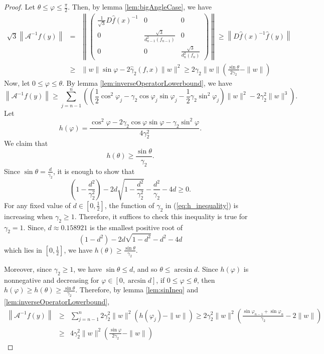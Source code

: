 \documentclass[12pt,oneside,reqno]{amsart}
\theoremstyle{definition}
\begin{document}
		\begin{proof}
			Let $\theta\leq \varphi\leq \frac{\pi}{2}$. Then, by lemma \ref{lem:bigAngleCase}, we have
			{\footnotesize
				\begin{eqnarray*}
					\sqrt{3}\left\|\mathcal{A}^{-1}f(y)\right\| & = &  \left\|\left(\begin{array}{ccc}
						\frac{1}{\sqrt{3}}D\hat{f}(x)^{-1} & 0 & 0\\
						0 & \frac{\sqrt{3}}{d_{n-1}^2(f_{n-1})} & 0 \\
						0 & 0 & \frac{\sqrt{3}}{d_{n}^2(f_{n})}
					\end{array}\right)\right\|\geq \left\|D\hat{f}(x)^{-1}\hat{f}(y)\right\|\\
					&\geq & \|w\|\sin\varphi -2\hat{\gamma}_2(f,x)\|w\|^2 \geq 2\gamma_2\|w\|\left(\frac{\sin\theta}{2\gamma_2}-\|w\|\right)
				\end{eqnarray*}}
				Now, let $0\leq \varphi \leq \theta$. By lemma \ref{lem:inverseOperatorLowerbound}, we have
				{\footnotesize
					\[\left\|\mathcal{A}^{-1}f(y)\right\|\geq \sum\limits_{j=n-1}^n\left(\left(\frac{1}{2}\cos^2\varphi_{j}-\gamma_{2}\cos\varphi_j\sin\varphi_j-\frac{1}{2}\gamma_{2}\sin^2\varphi_j\right)\|w\|^2 -2\gamma_{2}^2\|w\|^3\right).\]}
				Let 
				{\footnotesize
					\[h(\varphi) = \frac{\cos^2 \varphi - 2\gamma_2 \cos\varphi \sin\varphi - \gamma_2\sin^2\varphi}{4\gamma_2^2}.\]}
				We claim that 
				\[h(\theta)\geq \frac{\sin\theta}{\gamma_2}.\]
				Since $\sin\theta=\frac{d}{\gamma_2}$, it is enough to show that
				{\footnotesize
					\begin{equation}\label{eq:h_inequality}
					\left(1-\frac{d^2}{\gamma_2^2}\right)-2d\sqrt{1-\frac{d^2}{\gamma_2^2}}-\frac{d^2}{\gamma_2}-4d\geq 0.
					\end{equation}}
				For any fixed value of $d\in \left[0,\frac{1}{2}\right]$, the function of $\gamma_2$ in (\ref{eq:h_inequality}) is increasing when $\gamma_2\geq 1$. Therefore, it suffices to check this inequality is true for $\gamma_2=1$. Since, $d\approx 0.158921$ is the smallest positive root of
				\[(1-d^2)-2d\sqrt{1-d^2}-d^2-4d\]
				which lies in $\left[0,\frac{1}{2}\right]$, we have $h(\theta)\geq\frac{\sin\theta}{\gamma_2}$.
				
				Moreover, since $\gamma_2\geq 1$, we have $\sin \theta \leq d$, and so $\theta \leq \arcsin d$. Since $h(\varphi)$ is nonnegative and decreasing for $\varphi\in \left[0,\arcsin d\right]$, if $0\leq \varphi \leq \theta$, then $h(\varphi)\geq h(\theta)\geq\frac{\sin \theta}{\gamma_2}$. Therefore, by lemma \ref{lem:sinIneq} and \ref{lem:inverseOperatorLowerbound},
				{\footnotesize \begin{eqnarray*}
						\left\|\mathcal{A}^{-1}f(y)\right \|&\geq& \sum\limits_{j=n-1}^n 2\gamma_2^2\|w\|^2\left(h(\varphi_{j})-\|w\|\right)\geq 2\gamma_2^2\|w\|^2\left(\frac{\sin\varphi_{n-1}+\sin\varphi_{n}}{\gamma_2}-2\|w\|\right)\\
						& \geq & 4\gamma_2^2\|w\|^2\left(\frac{\sin\varphi}{2\gamma_2}-\|w\|\right)
					\end{eqnarray*}}
				\end{proof}
\end{document}
